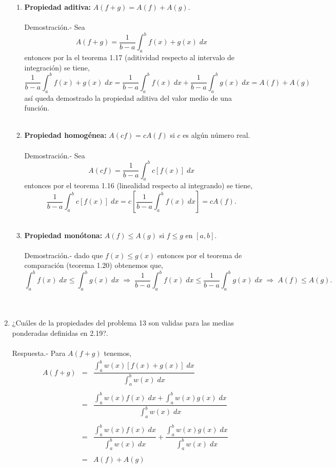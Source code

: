 \begin{enumerate}[\bfseries 1.]
\begin{enumerate}[\bfseries (a)]
	\item \textbf{Propiedad aditiva:} $A(f+g) = A(f)+A(g)$.\\\\
	    Demostración.-\; Sea $$A(f+g) = \dfrac{1}{b-a}\int_a^b f(x) + g(x) \; dx$$
	    entonces por la el teorema 1.17 (aditividad respecto al intervalo de integración) se tiene,
	    $$\dfrac{1}{b-a}\int_a^b f(x) + g(x) \; dx = \dfrac{1}{b-a}\int_a^b f(x)\; dx + \dfrac{1}{b-a}\int_a^b g(x)\; dx = A(f) + A(g)$$
	    así queda demostrado la propiedad aditiva del valor medio de una función.\\\\

	\item \textbf{Propiedad homogénea:} $A(cf)=c A(f)$ si $c$ es algún número real.\\\\
	    Demostración.-\; Sea $$A(cf)=\dfrac{1}{b-a}\int_a^b c[f(x)]\; dx$$
	    entonces por el teorema 1.16 (linealidad respecto al integrando) se tiene,
	    $$\dfrac{1}{b-a}\int_a^b c[f(x)]\; dx = c\left[\dfrac{1}{b-a}\int_a^b f(x)\; dx\right] = cA(f).$$\\

	\item \textbf{Propiedad monótona:} $A(f)\leq A(g)$ si $f\leq g$ en $[a,b]$.\\\\
	    Demostración.-\; dado que $f(x)\leq g(x)$ entonces por el teorema de comparación (teorema 1.20) obtenemos que,
	    $$\int_a^b f(x)\; dx \leq \int_a^b g(x)\; dx \; \Longrightarrow \; \dfrac{1}{b-a}\int_a^b f(x)\; dx\leq \dfrac{1}{b-a}\int_a^b g(x)\; dx \; \Longrightarrow \; A(f)\leq A(g).$$\\\\
    \end{enumerate}

\item ¿Cuáles de la propiedades del problema 13 son validas para las medias ponderadas definidas en 2.19?.\\\\
    Respuesta.-\; Para $A(f+g)$ tenemos,
    $$\begin{array}{rcl}
	A(f+g)&=&\dfrac{\int_a^b w(x)\left[f(x)+g(x)\right]\; dx}{\int_a^b w(x)\; dx}\\\\
	      &=&\dfrac{\int_a^b w(x)f(x)\; dx + \int_a^b w(x)g(x)\; dx}{\int_a^b w(x)\; dx}\\\\
	      &=&\dfrac{\int_a^b w(x)f(x)\; dx}{\int_a^b w(x)\; dx}+\dfrac{\int_a^b w(x)g(x)\; dx}{\int_a^b w(x)\; dx}\\\\
	      &=&A(f)+A(g)\\\\
    \end{array}$$


\end{enumerate}
